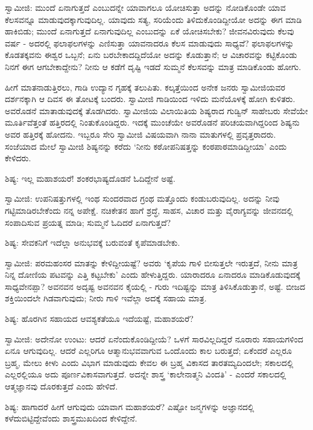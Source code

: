 ಸ್ವಾಮೀಜಿ: ಮುಂದೆ ಏನಾಗುತ್ತದೆ ಎಂಬುದನ್ನೇ ಯಾವಾಗಲೂ ಯೋಚಿಸುತ್ತಾ ಅದನ್ನು ನೋಡಿಕೊಂಡೇ ಯಾವ ಕೆಲಸವನ್ನೂ ಮಾಡುವುದಕ್ಕಾಗುವುದಿಲ್ಲ. ಯಾವುದು ಸತ್ಯ, ಸರಿಯೆಂದು ತಿಳಿದುಕೊಂಡಿದ್ದೀಯೋ ಅದನ್ನು ಈಗ ಮಾಡಿ ಹಾಕಿಬಿಡು; ಮುಂದೆ ಏನಾಗುತ್ತದೆ ಏನಾಗುವುದಿಲ್ಲ ಎಂಬುದನ್ನು ಏಕೆ ಯೋಚಿಸಬೇಕು? ಜೀವನವಿರುವುದು ಕೆಲವು ವರ್ಷ - ಅದರಲ್ಲಿ ಫಲಾಫಲಗಳನ್ನು ಎಣಿಸುತ್ತಾ ಯಾವನಾದರೂ ಕೆಲಸ ಮಾಡುವುದು ಸಾಧ್ಯವೆ? ಫಲಾಫಲಗಳನ್ನು ಕೊಡತಕ್ಕವನು ಈಶ್ವರ ಒಬ್ಬನೆ; ಏನು ಬರಬೇಕಾದದ್ದಿದೆಯೋ ಅದನ್ನು ಕೊಡುತ್ತಾನೆ; ಆ ವಿಚಾರವನ್ನು ಕಟ್ಟಿಕೊಂಡು ನಿನಗೆ ಈಗ ಆಗಬೇಕಾದ್ದೇನು? ನೀನು ಆ ಕಡೆಗೆ ದೃಷ್ಟಿ ಇಡದೆ ಸುಮ್ಮನೆ ಕೆಲಸವನ್ನು ಮಾತ್ರ ಮಾಡಿಕೊಂಡು ಹೋಗು.

ಹೀಗೆ ಮಾತನಾಡುತ್ತಿರಲು, ಗಾಡಿ ಉದ್ಯಾನ ಗೃಹಕ್ಕೆ ತಲುಪಿತು. ಕಲ್ಕತ್ತೆಯಿಂದ ಅನೇಕ ಜನರು ಸ್ವಾಮೀಜಿಯವರ ದರ್ಶನಕ್ಕಾಗಿ ಆ ದಿವಸ ಈ ತೋಟಕ್ಕೆ ಬಂದರು. ಸ್ವಾಮೀಜಿ ಗಾಡಿಯಿಂದ ಇಳಿದು ಮನೆಯೊಳಕ್ಕೆ ಹೋಗಿ ಕುಳಿತರು. ಅವರೊಡನೆ ಮಾತಾಡುವುದಕ್ಕೆ ತೊಡಗಿದರು. ಸ್ವಾಮೀಜಿಯ ವಿಲಾಯಿತಿಯ ಶಿಷ್ಯರಾದ ಗುಡ್ವಿನ್ ಸಾಹೇಬರು ಸೇವೆಯೇ ಮೂರ್ತಿವೆತ್ತಂತೆ ಹತ್ತಿರದಲ್ಲಿ ನಿಂತುಕೊಂಡಿದ್ದರು. ಇದಕ್ಕೆ ಮುಂಚೆಯೇ ಅವರೊಡನೆ ಪರಿಚಯವಾಗಿದ್ದರಿಂದ ಶಿಷ್ಯನು ಅವರ ಹತ್ತಿರಕ್ಕೆ ಹೋದನು. ಇಬ್ಬರೂ ಸೇರಿ ಸ್ವಾಮೀಜಿ ವಿಷಯವಾಗಿ ನಾನಾ ಮಾತುಗಳಲ್ಲಿ ಪ್ರವೃತ್ತರಾದರು. ಸಂಜೆಯಾದ ಮೇಲೆ ಸ್ವಾಮೀಜಿ ಶಿಷ್ಯನನ್ನು ಕರೆದು ‘ನೀನು ಕಠೋಪನಿಷತ್ತನ್ನು ಕಂಠಪಾಠಮಾಡಿದ್ದೀಯಾ’ ಎಂದು ಕೇಳಿದರು.

ಶಿಷ್ಯ: ಇಲ್ಲ ಮಹಾಶಯರೆ! ಶಂಕರಭಾಷ್ಯದೊಡನೆ ಓದಿದ್ದೇನೆ ಅಷ್ಟೆ.

ಸ್ವಾಮೀಜಿ: ಉಪನಿಷತ್ತುಗಳಲ್ಲಿ ಇಂಥ ಸುಂದರವಾದ ಗ್ರಂಥ ಮತ್ತೊಂದು ಕಂಡುಬರುವುದಿಲ್ಲ. ಅದನ್ನು ನೀವು ಗಟ್ಟಿಮಾಡಿರಬೇಕೆಂದು ನನ್ನ ಅಪೇಕ್ಷೆ. ನಚಿಕೇತನ ಹಾಗೆ ಶ್ರದ್ಧೆ, ಸಾಹಸ, ವಿಚಾರ ಮತ್ತು ವೈರಾಗ್ಯವನ್ನು ಜೀವನದಲ್ಲಿ ಸಂಪಾದಿಸುವ ಪ್ರಯತ್ನ ಮಾಡಿ; ಸುಮ್ಮನೆ ಓದಿದರೆ ಏನಾಗುತ್ತದೆ?

ಶಿಷ್ಯ: ಸೇವಕನಿಗೆ ಇದೆಲ್ಲಾ ಅನುಭವಕ್ಕೆ ಬರುವಂತೆ ಕೃಪೆಮಾಡಬೇಕು.

ಸ್ವಾಮೀಜಿ: ಪರಮಹಂಸರ ಮಾತನ್ನು ಕೇಳಿದ್ದೀಯಷ್ಟೆ? ಅವರು ‘ಕೃಪೆಯ ಗಾಳಿ ಬೀಸುತ್ತಲೇ ಇರುತ್ತದೆ, ನೀನು ಮಾತ್ರ ನಿನ್ನ ದೋಣಿಯ ಪಟವನ್ನು ಎತ್ತಿ ಕಟ್ಟಬೇಕು’ ಎಂದು ಹೇಳುತ್ತಿದ್ದರು. ಯಾರಾದರೂ ಏನಾದರೂ ಮಾಡಿಕೊಡುವುದಕ್ಕೆ ಸಾಧ್ಯವೇನಪ್ಪಾ? ಅವನವನ ಅದೃಷ್ಟ ಅವನವನ ಕೈಯಲ್ಲಿ - ಗುರು ಇದಿಷ್ಟನ್ನು ಮಾತ್ರ ತಿಳಿಸಿಕೊಡುತ್ತಾನೆ, ಅಷ್ಟೆ. ಬೀಜದ ಶಕ್ತಿಯಿಂದಲೇ ಗಿಡವಾಗುವುದು; ನೀರು ಗಾಳಿ ಇವೆಲ್ಲಾ ಅದಕ್ಕೆ ಸಹಾಯ ಮಾತ್ರ.

ಶಿಷ್ಯ: ಹೊರಗಿನ ಸಹಾಯದ ಆವಶ್ಯಕತೆಯೂ ಇದೆಯಷ್ಟೆ, ಮಹಾಶಯರೆ?

ಸ್ವಾಮೀಜಿ: ಅದೇನೋ ಉಂಟು: ಆದರೆ ಏನೆಂದುಕೊಂಡಿದ್ದೀಯೆ? ಒಳಗೆ ಸಾರವಿಲ್ಲದಿದ್ದರೆ ನೂರಾರು ಸಹಾಯಗಳಿಂದ ಏನೂ ಆಗುವುದಿಲ್ಲ. ಆದರೆ ಎಲ್ಲರಿಗೂ ಆತ್ಮಾನುಭವವಾಗುವ ಒಂದೊಂದು ಕಾಲ ಬರುತ್ತದೆ; ಏಕೆಂದರೆ ಎಲ್ಲರೂ ಬ್ರಹ್ಮ, ಮೇಲು ಕೀಳು ಎಂದು ವಿಭಾಗ ಮಾಡುವುದು ಕೇವಲ ಈ ಬ್ರಹ್ಮ ವಿಕಾಸದ ತಾರತಮ್ಯದಿಂದಲೇ; ಸಕಾಲದಲ್ಲಿ ಎಲ್ಲರಲ್ಲಿಯೂ ಅದು ಪೂರ್ಣವಿಕಾಸವಾಗುತ್ತದೆ. ಅದನ್ನೇ ಶಾಸ್ತ್ರ ‘ಕಾಲೇನಾತ್ಮನಿ ವಿಂದತಿ’ - ಎಂದರೆ ಸಕಾಲದಲ್ಲಿ ಆತ್ಮಜ್ಞಾನವು ದೊರಕುತ್ತದೆ ಎಂದು ಹೇಳಿದೆ.

ಶಿಷ್ಯ: ಹಾಗಾದರೆ ಹೀಗೆ ಆಗುವುದು ಯಾವಾಗ ಮಹಾಶಯರೆ? ಎಷ್ಟೋ ಜನ್ಮಗಳನ್ನು ಅಜ್ಞಾನದಲ್ಲಿ ಕಳೆದುಬಿಟ್ಟಿದ್ದೇವೆಂದು ಶಾಸ್ತ್ರಮುಖದಿಂದ ಕೇಳಿದ್ದೇನೆ.

